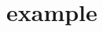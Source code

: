 

\appendixpage
\setcounter{section}{0}
\renewcommand{\thesection}{\Alph{section}}

\section{example}
